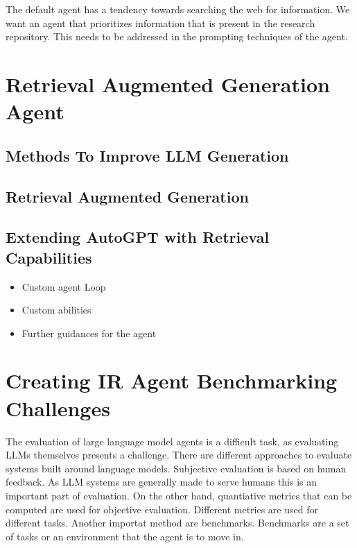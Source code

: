 \documentclass[english, version-2022-01]{uzl-thesis}
\begin{document}
The default agent has a tendency towards searching the web for information. We want an agent that prioritizes information that is present in the research repository.
This needs to be addressed in the prompting techniques of the agent.

\chapter{Retrieval Augmented Generation Agent}


\section{Methods To Improve LLM Generation}


\section{Retrieval Augmented Generation}


\section{Extending AutoGPT with Retrieval Capabilities}

\begin{itemize}
	\item Custom agent Loop
	\item Custom abilities
	\item Further guidances for the agent
\end{itemize}

\chapter{Creating IR Agent Benchmarking Challenges}

The evaluation of large language model agents is a difficult task, as evaluating LLMs themselves presents a challenge.
There are different approaches to evaluate systems built around language models. Subjective evaluation is based on human feedback.
As LLM systems are generally made to serve humans this is an important part of evaluation.
On the other hand, quantiative metrics that can be computed are used for objective evaluation. Different metrics are used for different tasks. Another importat method are benchmarks.
Benchmarks are a set of tasks or an environment that the agent is to move in.
\end{document}
